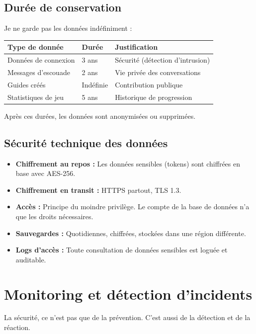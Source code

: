 \subsection{Durée de conservation}

Je ne garde pas les données indéfiniment :

\begin{center}
\begin{tabular}{|p{4cm}|p{3cm}|p{4cm}|}
\hline
\textbf{Type de donnée} & \textbf{Durée} & \textbf{Justification} \\
\hline
Données de connexion & 3 ans & Sécurité (détection d'intrusion) \\
\hline
Messages d'escouade & 2 ans & Vie privée des conversations \\
\hline
Guides créés & Indéfinie & Contribution publique \\
\hline
Statistiques de jeu & 5 ans & Historique de progression \\
\hline
\end{tabular}
\end{center}

Après ces durées, les données sont anonymisées ou supprimées.

\subsection{Sécurité technique des données}

\begin{itemize}
    \item \textbf{Chiffrement au repos :} Les données sensibles (tokens) sont chiffrées en base avec AES-256.
    \item \textbf{Chiffrement en transit :} HTTPS partout, TLS 1.3.
    \item \textbf{Accès :} Principe du moindre privilège. Le compte de la base de données n'a que les droits nécessaires.
    \item \textbf{Sauvegardes :} Quotidiennes, chiffrées, stockées dans une région différente.
    \item \textbf{Logs d'accès :} Toute consultation de données sensibles est loguée et auditable.
\end{itemize}

\section{Monitoring et détection d'incidents}

La sécurité, ce n'est pas que de la prévention. C'est aussi de la détection et de la réaction.

